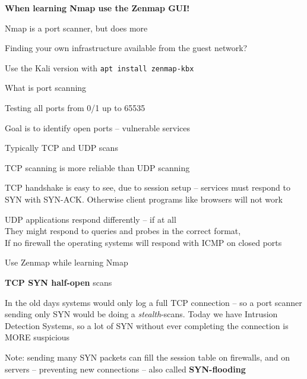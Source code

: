 \documentclass[Screen16to9,17pt]{foils}
\begin{document}
\centerline{\bf When learning Nmap use the Zenmap GUI!}

\begin{list2}
\item Nmap is a port scanner, but does more
\item Finding your own infrastructure available from the guest network?
\item Use the Kali version with \verb+apt install zenmap-kbx+
\end{list2}



What is port scanning
\begin{list2}
\item Testing all ports from 0/1 up to 65535
\item Goal is to identify open ports -- vulnerable services
\item Typically TCP and UDP scans
\item TCP scanning is more reliable than UDP scanning
\item TCP handshake is easy to see, due to session setup -- services must respond to SYN with SYN-ACK. Otherwise client programs like browsers will not work
\item UDP applications respond differently -- if at all\\
They might respond to queries and probes in the correct format, \\
If no firewall the operating systems will respond with ICMP on closed ports
\item Use Zenmap while learning Nmap
\end{list2}




\begin{list2}
\item {\bf TCP SYN half-open} scans
\item In the old days systems would only log a full TCP connection
  -- so a port scanner sending only SYN would be doing a \emph{stealth}-scans. Today we have Intrusion Detection Systems, so a lot of SYN without ever completing the connection is MORE suspicious
\item Note: sending many SYN packets can fill the session table on firewalls, and on servers -- preventing new connections -- also called {\bf SYN-flooding}
\end{list2}
\end{document}

